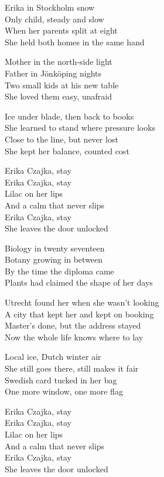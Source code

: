\begin{lyrics}
Erika in Stockholm snow\\
Only child, steady and slow\\
When her parents split at eight\\
She held both homes in the same hand

Mother in the north-side light\\
Father in Jönköping nights\\
Two small kids at his new table\\
She loved them easy, unafraid

Ice under blade, then back to books\\
She learned to stand where pressure looks\\
Close to the line, but never lost\\
She kept her balance, counted cost

Erika Czajka, stay\\
Erika Czajka, stay\\
Lilac on her lips\\
And a calm that never slips\\
Erika Czajka, stay\\
She leaves the door unlocked

Biology in twenty seventeen\\
Botany growing in between\\
By the time the diploma came\\
Plants had claimed the shape of her days

Utrecht found her when she wasn’t looking\\
A city that kept her and kept on booking\\
Master’s done, but the address stayed\\
Now the whole life knows where to lay

Local ice, Dutch winter air\\
She still goes there, still makes it fair\\
Swedish card tucked in her bag\\
One more window, one more flag

Erika Czajka, stay\\
Erika Czajka, stay\\
Lilac on her lips\\
And a calm that never slips\\
Erika Czajka, stay\\
She leaves the door unlocked


\end{lyrics}
